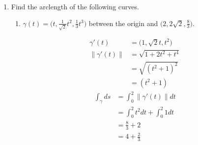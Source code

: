 \documentclass{article}
\newcommand{\norm}[1]{\| #1 \|}
\begin{document}
\begin{enumerate}
\newpage
\item Find the arclength of the following curves.
\begin{enumerate}
    \item $\displaystyle \gamma(t) = \Bigg(t,\frac{1}{\sqrt{2}}t^2,\frac{1}{3}t^3 \Bigg)$ between the origin and $\displaystyle \Bigg(2,2\sqrt{2},\frac{8}{3}\Bigg)$.
    \begin{multicols}{2} 
    \noindent
    \begin{align*} 
        \gamma'(t) &= \Big(1, \sqrt{2}t, t^2 \Big) \\
        \norm{\gamma'(t)} &= \sqrt{1 + 2t^2 + t^4 } \\
        &= \sqrt{(t^2 + 1)^2 } \\ 
        &= (t^2 + 1) \
    \end{align*}
    \begin{align*}
        \int_\gamma ds &= \int_0^2 \norm{\gamma'(t)} dt \\
        &= \int_0^2 t^2 dt + \int_0^2 1 dt \\
        &= \frac{8}{3} + 2 \\
        &= 4 + \frac{2}{3}
    \end{align*}


\end{multicols}
\end{enumerate}
\end{enumerate}
\end{document}
